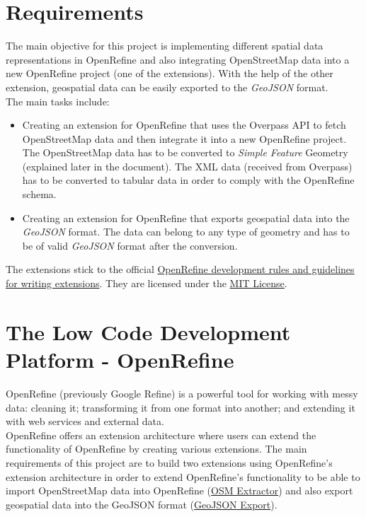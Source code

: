 \section{Requirements}
The main objective for this project is implementing different spatial data representations in OpenRefine and also integrating OpenStreetMap data into
a new OpenRefine project (one of the extensions). With the help of the other extension, geospatial data can be easily exported to the \textit{GeoJSON} format.\\
\newline
The main tasks include:
\begin{itemize}
   \item Creating an extension for OpenRefine that uses the Overpass API to fetch OpenStreetMap data and then integrate it into a new OpenRefine project.
    \subitem The OpenStreetMap data has to be converted to \textit{Simple Feature} Geometry (explained later in the document).
    \subitem The XML data (received from Overpass) has to be converted to tabular data in order to comply with the OpenRefine schema.
   \item Creating an extension for OpenRefine that exports geospatial data into the \textit{GeoJSON} format.
    \subitem  The data can belong to any type of geometry and has to be of valid \textit{GeoJSON} format after the conversion.
\end{itemize}
The extensions stick to the official \href{https://docs.openrefine.org/technical-reference/writing-extensions}{OpenRefine development rules and guidelines for writing extensions}. They are licensed
under the \href{https://opensource.org/licenses/MIT}{MIT License}.
\newpage
\section{The Low Code Development Platform - OpenRefine}
OpenRefine (previously Google Refine) is a powerful tool for working with messy data: cleaning it; transforming it from one format into another; and extending it with web services and external data. \cite{AboutOpenRefine}\\
\newline
OpenRefine offers an extension architecture where users can extend the functionality of OpenRefine by creating various extensions.
The main requirements of this project are to build two extensions using OpenRefine's extension architecture in order to extend OpenRefine's functionality to
be able to import OpenStreetMap data into OpenRefine (\hyperref[ch:the-osm-extractor-extension]{OSM Extractor}) and also export geospatial
data into the GeoJSON format (\hyperref[ch:the-geojson-export-extension]{GeoJSON Export}).

